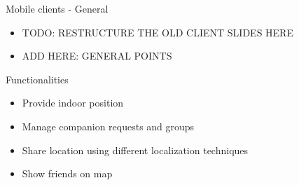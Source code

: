 \documentclass[11pt]{beamer}
\begin{document}
\begin{frame}{Mobile clients - General}

  \begin{itemize}

    \item TODO: RESTRUCTURE THE OLD CLIENT SLIDES HERE
    \item ADD HERE: GENERAL POINTS
  \end{itemize}
    
  Functionalities
  \begin{itemize}
   \item Provide indoor position
    \item Manage companion requests and groups
    \item Share location using different localization techniques 
    \item Show friends on map

  \end{itemize}

\end{frame}
\end{document}
